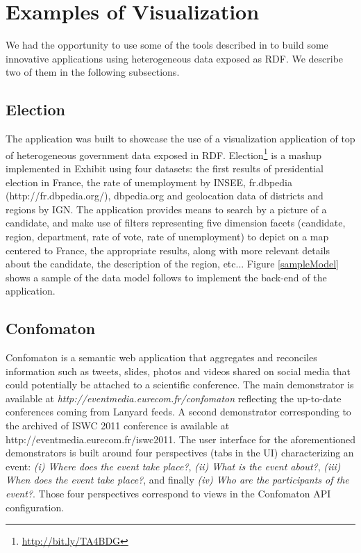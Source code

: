\documentclass[a4paper,11pt]{report}
\begin{document}
\section{Examples of Visualization}
We had the opportunity to use some of the tools described in \cite{deliverable2012b} to build some innovative applications using heterogeneous data exposed as RDF. We describe two of them in the following subsections.
 
\subsection{Election}
The application was built to showcase the use of a visualization application of top of heterogeneous government data exposed in RDF.
Election\footnote{\url{http://bit.ly/TA4BDG}} is a mashup implemented in Exhibit using four datasets: the first results of presidential election in France, the rate of unemployment by INSEE,
fr.dbpedia (http://fr.dbpedia.org/), dbpedia.org and geolocation data of districts and regions by IGN. The application provides means to search by a picture of 
a candidate, and make use of filters representing five dimension facets (candidate, region, department, rate of vote, rate of unemployment) to depict on 
a map centered to France, the appropriate results, along with more relevant details about the candidate, the description of the region, etc... Figure \ref{sampleModel} shows 
a sample of the data model follows to implement the back-end of the application.   


\subsection{Confomaton}
Confomaton \cite{khrouf-eswc2012} is a semantic web application that aggregates and reconciles information such as tweets, slides, photos and videos shared on social media that could potentially be attached to a scientific conference. The main demonstrator is available at \textit{http://eventmedia.eurecom.fr/confomaton} reflecting the up-to-date conferences coming from Lanyard feeds. A second demonstrator corresponding to the archived of ISWC 2011 conference \cite{khrouf-ramms12} is available at http://eventmedia.eurecom.fr/iswc2011. The user interface for the aforementioned demonstrators is built around four perspectives (tabs in the UI) characterizing an event: \textit{(i) Where does the event take place?}, \textit{(ii) What is the event about?},  \textit{(iii) When does the event take place?}, and finally \textit{(iv) Who are the participants of the event?}. Those four perspectives correspond to views in the Confomaton API configuration. 
\end{document}
